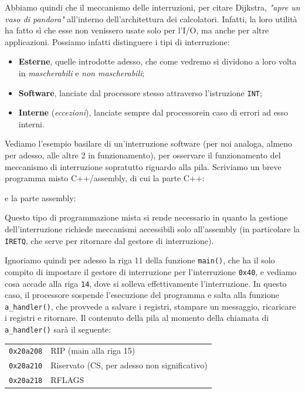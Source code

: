 \documentclass[a4paper,11pt]{article}
\begin{document}
Abbiamo quindi che il meccanismo delle interruzioni, per citare Dijkstra, \textit{"apre un vaso di pandora"} all'interno dell'architettura dei calcolatori.
Infatti, la loro utilità ha fatto sì che esse non venissero usate solo per l'I/O, ma anche per altre applicazioni.
Possiamo infatti distinguere i tipi di interruzione:
\begin{itemize}
	\item \textbf{Esterne}, quelle introdotte adesso, che come vedremo si dividono a loro volta in \textit{mascherabili} e \textit{non mascherabili};
	\item \textbf{Software}, lanciate dal processore stesso attraverso l'istruzione \lstinline|INT|;
	\item \textbf{Interne} (\textit{eccezioni}), lanciate sempre dal processorein caso di errori ad esso interni.
\end{itemize}

Vediamo l'esempio basilare di un'interruzione software (per noi analoga, almeno per adesso, alle altre 2 in funzionamento), per osservare il funzionamento del meccanismo di interruzione sopratutto riguardo alla pila.
Scriviamo un breve programma misto C++/assembly, di cui la parte C++:
\lstset{style=codestyle, language=C++}

e la parte assembly:
\lstset{style=codestyle, language=assembler}


Questo tipo di programmazione mista si rende necessario in quanto la gestione dell'interruzione richiede meccanismi accessibili solo all'assembly (in particolare la \lstinline|IRETQ|, che serve per ritornare dal gestore di interruzione).

Ignoriamo quindi per adesso la riga 11 della funzione \lstinline|main()|, che ha il solo compito di impostare il gestore di interruzione per l'interruzione \lstinline|0x40|, e vediamo cosa accade alla riga \lstinline|14|, dove si solleva effettivamente l'interruzione.
In questo caso, il processore sospende l'esecuzione del programma e salta alla funzione \lstinline|a_handler()|, che provvede a salvare i registri, stampare un messaggio, ricaricare i registri e ritornare.
Il contenuto della pila al momento della chiamata di \lstinline|a_handler()| sarà il seguente:
\begin{table}[h!]
	\center
	\begin{tabular} { c | p{9cm} }
		\lstinline|0x20a208| & RIP (main alla riga 15) \\
		\lstinline|0x20a210| & Riservato (CS, per adesso non significativo) \\
		\lstinline|0x20a218| & RFLAGS 
	\end{tabular}
\end{table}
\end{document}

